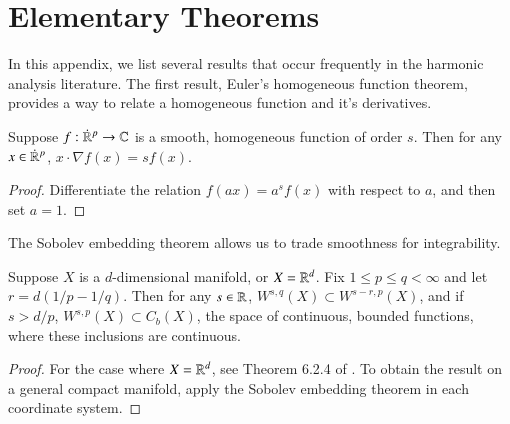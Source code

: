 
\renewcommand{\thechapter}{A}
\chapter{Elementary Theorems} \label{cha:elementary_theorems}

In this appendix, we list several results that occur frequently in the harmonic analysis literature. The first result, Euler's homogeneous function theorem, provides a way to relate a homogeneous function and it's derivatives.

\begin{theorem} \label{thm:Euler}
    Suppose $f: {\dot{\RR}{\vphantom{\RR}}^p} \to \CC$ is a smooth, homogeneous function of order $s$. Then for any $x \in {\dot{\RR}{\vphantom{\RR}}^p}$, $x \cdot \nabla f(x) = s f(x)$.
\end{theorem}
\begin{proof}
    Differentiate the relation $f(ax) = a^s f(x)$ with respect to $a$, and then set $a = 1$.
\end{proof}

The Sobolev embedding theorem allows us to trade smoothness for integrability.

\begin{theorem} \label{Chp:Sobolev}
    Suppose $X$ is a $d$-dimensional manifold, or $X = \operatorname{\mathbb{R}}^d$. Fix $1 \leq p \leq q < \infty$ and let $r = d(1/p - 1/q)$. Then for any $s \in \operatorname{\mathbb{R}}$, $W^{s,q}(X) \subset W^{s-r,p}(X)$, and if $s > d/p$, $W^{s,p}(X) \subset C_b(X)$, the space of continuous, bounded functions, where these inclusions are continuous.
\end{theorem}
\begin{proof}
    For the case where $X = \operatorname{\mathbb{R}}^d$, see Theorem 6.2.4 of \cite{GrafakosModern}. To obtain the result on a general compact manifold, apply the Sobolev embedding theorem in each coordinate system.
\end{proof}

\begin{comment}
\begin{theorem}[Bernstein's Inequality]
    Fix $1 \leq p \leq \infty$, $s \in \RR$, and $R > 0$. If the Fourier transform of a function $f: \RR^d \to \CC$ is supported on $\{ \xi : 0 \leq |\xi| \leq R \}$, then
    \[ \| f \|_{W^{s,p}(\RR^d)} \sim \langle R \rangle^s \| f \|_{L^p(\RR^d)}. \]%
    Similarily, suppose $X$ is a compact manifold, and $P$ is a classical, elliptic, self-adjoint operator of order one on $X$. If $f: \RR^d \to \CC$ can be written as a linear combination of eigenfunctions of $P$, whose eigenvalues are contained in the interval $[0,R]$, then
        \[ \| f \|_{W^{s,p}(X)} \sim \langle R \rangle^s \| f \|_{L^p(\RR^d)} \]
\end{theorem}
\begin{proof}
    For the result on $\RR^d$, see Proposition 5.3 of \cite{Wolff}.
\end{proof}
\end{comment}

